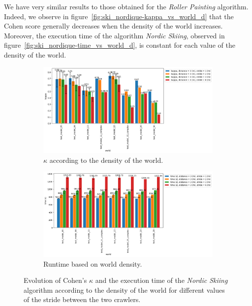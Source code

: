 We have very similar results to those obtained for the \textit{Roller Painting} algorithm.
Indeed, we observe in figure~\ref{fig:ski_nordique-kappa_vs_world_d} that the Cohen score generally decreases when the density of the world increases.
Moreover, the execution time of the algorithm \textit{Nordic Skiing}, observed in figure~\ref{fig:ski_nordique-time_vs_world_d}, is constant for each value of the density of the world.

\begin{figure}[h!]
	\centering
	\begin{subfigure}[t]{0.9\linewidth}
		\includegraphics[width=\linewidth]{graphics/ski_nordique-kappa_vs_world_for_each_s.png}
		\caption{$\kappa$ according to the density of the world.}
		\label{fig:ski_nordique-kappa_vs_world_s}
	\end{subfigure}
	\hfill
	\begin{subfigure}[t]{0.9\linewidth}
		\includegraphics[width=\linewidth]{graphics/ski_nordique-time_vs_world_for_each_s.png}
		\caption{Runtime based on world density.}
		\label{fig:ski_nordique-time_vs_world_s}
	\end{subfigure}
	\caption{Evolution of Cohen's $\kappa$ and the execution time of the \textit{Nordic Skiing} algorithm according to the density of the world for different values of the stride between the two crawlers.}
	\label{fig:ski_nordique-world_s}
\end{figure}


